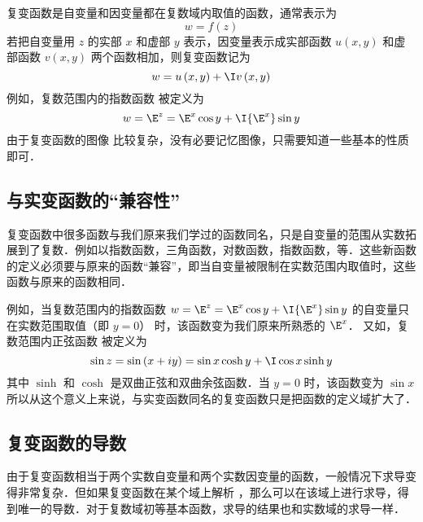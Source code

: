 
复变函数是自变量和因变量都在复数域内取值的函数，通常表示为
\begin{equation}
w = f\left( z \right)
\end{equation}
若把自变量用 $z$ 的实部 $x$ 和虚部 $y$ 表示，因变量表示成实部函数 $u\left( {x,y} \right)$ 和虚部函数 $v\left( {x,y} \right)$ 两个函数相加，则复变函数记为
\begin{equation}
w = u\left( {x,y} \right) + \I v\left( {x,y} \right)
\end{equation}
例如，复数范围内的指数函数%
被定义为
\begin{equation}
w = {\E^z} = {\E^x}\cos y + \I {\E^x}\sin y
\end{equation}
由于复变函数的图像%
比较复杂，没有必要记忆图像，只需要知道一些基本的性质即可．

\subsection{与实变函数的“兼容性”}
复变函数中很多函数与我们原来我们学过的函数同名，只是自变量的范围从实数拓展到了复数．例如以指数函数，三角函数，对数函数，指数函数，等．这些新函数的定义必须要与原来的函数“兼容”，即当自变量被限制在实数范围内取值时，这些函数与原来的函数相同．

例如，当复数范围内的指数函数%
 $w = {\E^z} = {\E^x}\cos y + \I {\E^x}\sin y$ 的自变量只在实数范围取值（即 $y = 0$） 时，该函数变为我们原来所熟悉的 $\E^x$． 
又如，复数范围内正弦函数%
被定义为
\begin{equation}
\sin z = \sin \left( {x + iy} \right) = \sin x\cosh y + \I\cos x\sinh y
\end{equation}
其中 $\sinh $ 和 $\cosh $ 是双曲正弦和双曲余弦函数．当 $y = 0$ 时，该函数变为 $\sin x$ 
所以从这个意义上来说，与实变函数同名的复变函数只是把函数的定义域扩大了．

\subsection{复变函数的导数}
由于复变函数相当于两个实数自变量和两个实数因变量的函数，一般情况下求导变得非常复杂．但如果复变函数在某个域上解析%
，那么可以在该域上进行求导，得到唯一的导数．对于复数域初等基本函数，求导的结果也和实数域的求导一样．















